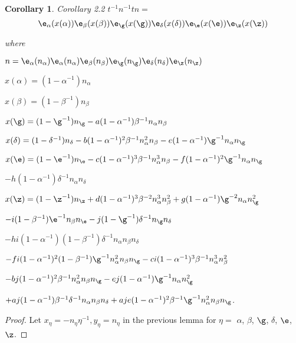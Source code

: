 \documentclass{memo-l}
\newtheorem{corollary}[theorem]{Corollary}
\theoremstyle{definition}
\theoremstyle{remark}
\numberwithin{section}{chapter}
\numberwithin{equation}{chapter}
\begin{document}
\begin{corollary}{Corollary 2.2}   $t^{-1}n^{-1}tn =$
$${\e}_{\alpha}(x({\alpha})){\e}_{\beta}(x({\beta}))
{\e}_{{\g}}(x({\g})){\e}_{{\delta}}(x({\delta}))
{\e}_{{\e}}(x({\e})){\e}_{{\z}}(x({\z}))$$

\noindent
where

$n = {\e}_{\alpha}(n_{\alpha}){\e}_{\alpha}
(n_{\alpha}){\e}_{\beta}(n_{\beta}){\e}_{{\g}}
(n_{{\g}}){\e}_{{\delta}}(n_{{\delta}}){\e}_{{\z}}
(n_{{\z}})$

$x({\alpha}) = (1-{\alpha}^{-1})n_{\alpha}$

$x({\beta}) = (1-{\beta}^{-1})n_{\beta}$

$x({\g}) = (1-{\g}^{-1})n_{{\g}} -a(1-{\alpha}^{-1}){\beta}^{-1}
n_{\alpha}n_{\beta}$

$x({\delta}) = (1-{\delta}^{-1})n_{{\delta}} -b(1-{\alpha}^{-1})^{2}
{\beta}^{-1}n_{\alpha}^{2}n_{\beta} -e(1-{\alpha}^{-1}){\g}^{-1}
n_{\alpha}n_{{\g}}$

$x({\e}) = (1-{\e}^{-1})n_{{\e}} -c(1-{\alpha}^{-1})^{3}
{\beta}^{-1}n_{\alpha}^{3}n_{\beta} -f(1-{\alpha}^{-1})^{2}{\g}^{-1}
n_{\alpha}n_{{\g}}$

\quad     $-h(1-{\alpha}^{-1}){\delta}^{-1}n_{\alpha}n_{{\delta}}$


$x({\z}) = (1-{\z}^{-1})n_{{\z}} + d(1-{\alpha}^{-1})^{3}{\beta}^{-2}
n_{\alpha}^{3}n_{\beta}^{2} + g(1-{\alpha}^{-1}){\g}^{-2}n_{\alpha}
n_{{\g}}^{2}$


\quad    $-i(1-{\beta}^{-1}){\e}^{-1}n_{\beta}n_{{\e}} -
j(1-{\g}^{-1}){\delta}^{-1}n_{{\g}}n_{{\delta}}$

\quad  $-hi(1-{\alpha}^{-1})(1-{\beta}^{-1}){\delta}^{-1}n_{\alpha}n_{\beta}
n_{{\delta}}$

\quad   $-fi(1-{\alpha}^{-1})^{2}(1-{\beta}^{-1}){\g}^{-1}n_{\alpha}^{2}
n_{\beta}n_{{\g}} -ci(1-{\alpha}^{-1})^{3}{\beta}^{-1}n_{\alpha}^{3}
n_{\beta}^{2}$

\quad    $-bj(1-{\alpha}^{-1})^{2}{\beta}^{-1}n_{\alpha}^{2}n_{\beta}
n_{{\g}} -ej(1-{\alpha}^{-1}){\g}^{-1}n_{\alpha}n_{{\g}}^{2}$

\quad    $+aj(1-{\alpha}^{-1}){\beta}^{-1}{\delta}^{-1}n_{\alpha}n_{\beta}
n_{{\delta}} +aje(1-{\alpha}^{-1})^{2}{\beta}^{-1}{\g}^{-1}n_{\alpha}^{2}
n_{\beta}n_{{\g}}$.
\end{corollary}

\begin{proof}    Let $x_{{\eta}} = -n_{{\eta}}{\eta}^{-1}, y_{{\eta}} =
n_{{\eta}}$ in the previous lemma for ${\eta} =$
${\alpha}$, ${\beta}$, ${\g}$, ${\delta}$, ${\e}$, ${\z}$.
\end{proof}
\end{document}
